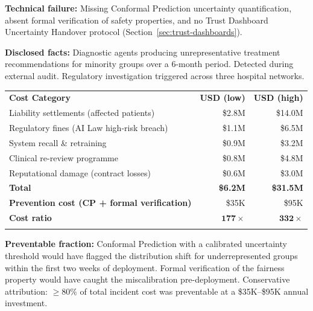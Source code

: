 \begin{tcolorbox}[casebox,
  title={Financial Autopsy 4: Hallucination in Healthcare}]

\textbf{Technical failure:} Missing Conformal Prediction
uncertainty quantification, absent formal verification of
safety properties, and no Trust Dashboard Uncertainty Handover
protocol (Section~\ref{sec:trust-dashboards}).

\textbf{Disclosed facts:} Diagnostic agents producing
unrepresentative treatment recommendations for minority groups
over a 6-month period.
Detected during external audit.
Regulatory investigation triggered across three hospital networks.

\medskip
\begin{tabular}{@{}lrr@{}}
\hline\noalign{\smallskip}
\textbf{Cost Category} & \textbf{USD (low)} & \textbf{USD (high)} \\
\noalign{\smallskip}\svhline\noalign{\smallskip}
Liability settlements (affected patients) & \$2.8M & \$14.0M \\
Regulatory fines (AI Law high-risk breach) & \$1.1M & \$6.5M \\
System recall \& retraining & \$0.9M & \$3.2M \\
Clinical re-review programme & \$0.8M & \$4.8M \\
Reputational damage (contract losses) & \$0.6M & \$3.0M \\
\noalign{\smallskip}\hline\noalign{\smallskip}
\textbf{Total} & \textbf{\$6.2M} & \textbf{\$31.5M} \\
\noalign{\smallskip}\hline\noalign{\smallskip}
\textbf{Prevention cost (CP + formal verification)} & \$35K & \$95K \\
\textbf{Cost ratio} & $\mathbf{177\times}$ & $\mathbf{332\times}$ \\
\noalign{\smallskip}\hline\noalign{\smallskip}
\end{tabular}

\medskip
\textbf{Preventable fraction:}
Conformal Prediction with a calibrated uncertainty threshold
would have flagged the distribution shift for underrepresented
groups within the first two weeks of deployment.
Formal verification of the fairness property would have caught
the miscalibration pre-deployment.
Conservative attribution: $\geq 80\%$ of total incident cost
was preventable at a \$35K--\$95K annual investment.
\end{tcolorbox}

